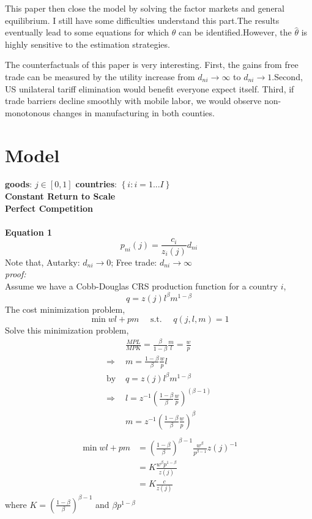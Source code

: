 \documentclass{article}
\begin{document}
This paper then close the model by solving the factor markets and general equilibrium. I still have some difficulties understand this part.The results eventually lead to some equations for which $\theta$ can be identified.However, the $\hat{\theta}$ is highly sensitive to the estimation strategies. 

The counterfactuals of this paper is very interesting. First, the gains from free trade can be measured by the utility increase from $d_{ni} \xrightarrow{}\infty$ to $d_{ni} \xrightarrow{}1$.Second, US unilateral tariff elimination would benefit everyone expect itself. Third, if trade barriers decline smoothly with mobile labor, we would observe non-monotonous changes in manufacturing in both counties.
\clearpage
\section{Model}
\textbf{goods}: $j \in [0, 1]$     \textbf{countries}:  $\left\{ i:i = 1...I \right\}$\\
\textbf{Constant Return to Scale}\\
\textbf{Perfect Competition}\\
\\
\textbf{Equation 1}
$$p_{ni}(j)=\frac{c_i}{z_i(j)}d_{ni}$$
Note that, Autarky: $d_{ni} \xrightarrow{} 0$; Free trade: $d_{ni} \xrightarrow{} \infty$ \\
\textit{proof:}\\
Assume we have a Cobb-Douglas CRS production function for a country $i$, 
$$q = z(j)l^\beta m^{1-\beta}$$
The cost minimization problem, 
$$\min wl+pm \text{  ~~~s.t. ~~  } q(j,l,m)=1$$
Solve this minimization problem,
\begin{equation*}
    \begin{split}
        &\frac{MPL}{MPK} = \frac{\beta}{1-\beta} \frac{m}{l} = \frac{w}{p}\\
        \Rightarrow & m = \frac{1-\beta}{\beta}\frac{w}{p}l\\
        \text{by } &  q = z(j)l^\beta m^{1-\beta}\\
        \Rightarrow & l = z^{-1} \left( \frac{1-\beta}{\beta} \frac{w}{p} \right)^{(\beta - 1)}\\
        & m = z^{-1} \left( \frac{1-\beta}{\beta} \frac{w}{p} \right)^\beta \\
    \end{split}
\end{equation*}
\begin{equation*}
    \begin{split}
        \min wl+pm &= \left( \frac{1-\beta}{\beta} \right)^{\beta-1} \frac{w^\beta}{p^{\beta-1}}{z(j)}^{-1}\\
        &= K\frac{w^\beta p^{1-\beta}}{z(j)}\\
        &= K\frac{c}{z(j)}
    \end{split}
\end{equation*}
where $K = \left( \frac{1-\beta}{\beta} \right)^{\beta-1}$ and $\beta p^{1-\beta}$
\clearpage
\end{document}
